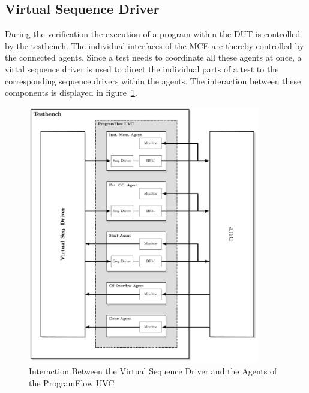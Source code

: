 \subsection{Virtual Sequence Driver}

During the verification the execution of a program within the DUT is controlled by the testbench.
The individual interfaces of the MCE are thereby controlled by the connected agents.
Since a test needs to coordinate all these agents at once, a virtal sequence driver is used to direct the individual parts of a test to the corresponding
sequence drivers within the agents. The interaction between these components is displayed in figure~\ref{fig:vsd}.

\begin{figure}[htb]
 \centering
 \includegraphics[width=0.9\textwidth,angle=0]{images/vsd}
 \caption{Interaction Between the Virtual Sequence Driver and the Agents of the ProgramFlow UVC}
\label{fig:vsd}
\end{figure}


